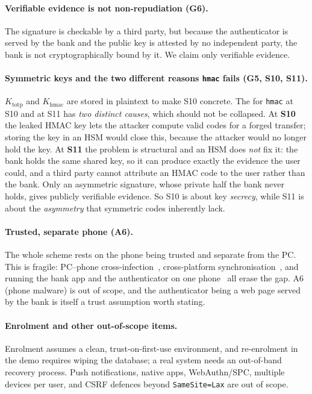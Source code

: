 \paragraph{Verifiable evidence is not non-repudiation (G6).}
The signature is checkable by a third party, but because the authenticator is
served by the bank and the public key is attested by no independent party, the
bank is not cryptographically bound by it. We claim only verifiable evidence.

\paragraph{Symmetric keys and the two different reasons \texttt{hmac} fails
(G5, S10, S11).}
$K_{\text{totp}}$ and $K_{\text{hmac}}$ are stored in plaintext to make S10
concrete. The \xmark{} for \texttt{hmac} at S10 and at S11 has \emph{two distinct
causes}, which should not be collapsed. At \textbf{S10} the leaked HMAC key lets
the attacker compute valid codes for a forged transfer; storing the key in an HSM
would close this, because the attacker would no longer hold the key. At
\textbf{S11} the problem is structural and an HSM does \emph{not} fix it: the bank
holds the same shared key, so it can produce exactly the evidence the user could,
and a third party cannot attribute an HMAC code to the user rather than the bank.
Only an asymmetric signature, whose private half the bank never holds, gives
publicly verifiable evidence. So S10 is about key \emph{secrecy}, while S11 is
about the \emph{asymmetry} that symmetric codes inherently lack.

\paragraph{Trusted, separate phone (A6).}
The whole scheme rests on the phone being trusted and separate from the PC. This
is fragile: PC--phone cross-infection~\cite{dmitrienko2014}, cross-platform
synchronisation~\cite{konoth2016}, and running the bank app and the authenticator
on one phone~\cite{haupert2018} all erase the gap. A6 (phone malware) is out of
scope, and the authenticator being a web page served by the bank is itself a
trust assumption worth stating.

\paragraph{Enrolment and other out-of-scope items.}
Enrolment assumes a clean, trust-on-first-use environment, and re-enrolment in
the demo requires wiping the database; a real system needs an out-of-band
recovery process. Push notifications, native apps, WebAuthn/SPC, multiple devices
per user, and CSRF defences beyond \texttt{SameSite=Lax} are out of scope.

